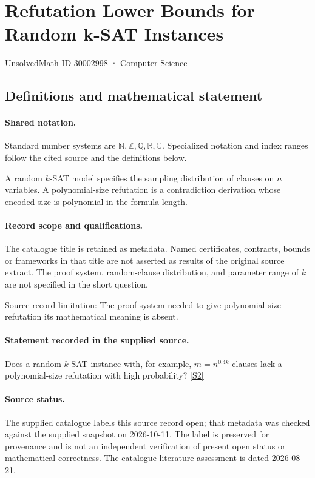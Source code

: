 \documentclass[11pt]{article}
\newcommand{\sref}[2]{\hyperlink{source:#1:#2}{[S#2]}}
\begin{document}
\setcounter{section}{30002997}
\section{Refutation Lower Bounds for Random k-SAT Instances}\label{30002998}
{\small\sffamily UnsolvedMath ID 30002998 · Computer Science}
\subsection{Definitions and mathematical statement}

\paragraph{Shared notation.}Standard number systems are $\mathbb N,\mathbb Z,\mathbb Q,\mathbb R,\mathbb C$. Specialized notation and index ranges follow the cited source and the definitions below.


A random $k$-SAT model specifies the sampling distribution of clauses on $n$ variables. A polynomial-size refutation is a contradiction derivation whose encoded size is polynomial in the formula length.
\paragraph{Record scope and qualifications.}
The catalogue title is retained as metadata. Named certificates, contracts, bounds or frameworks in that title are not asserted as results of the original source extract.
The proof system, random-clause distribution, and parameter range of $k$ are not specified in the short question.

Source-record limitation: The proof system needed to give polynomial-size refutation its mathematical meaning is absent.
\paragraph{Statement recorded in the supplied source.}
Does a random $k$-SAT instance with, for example, $m=n^{0.4k}$ clauses lack a polynomial-size refutation with high probability? \sref{30002998}{2}
\paragraph{Source status.}
The supplied catalogue labels this source record open; that metadata was checked against the supplied snapshot on 2026-10-11. The label is preserved for provenance and is not an independent verification of present open status or mathematical correctness. The catalogue literature assessment is dated 2026-08-21.
\end{document}
